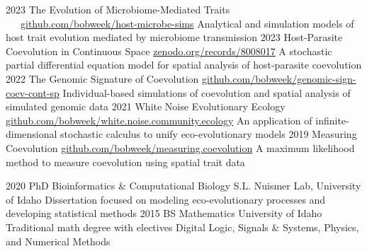 \documentclass[9pt]{developercv} %
\begin{document}
\vspace{-20 pt}
\begin{entrylist}
        \entry
		{2023}
		{The Evolution of Microbiome-Mediated Traits}
		{\ \ \ \href{https://github.com/bobweek/host-microbe-sims}{github.com/bobweek/host-microbe-sims}}
		{%
        Analytical and simulation models of host trait evolution mediated by microbiome transmission}
        \entry
		{2023}
		{Host-Parasite Coevolution in Continuous Space}
		{\href{https://zenodo.org/records/8008017}{zenodo.org/records/8008017}}
		{%
        A stochastic partial differential equation model for spatial analysis of host-parasite coevolution}
	\entry
		{2022}
		{The Genomic Signature of Coevolution}
		{\href{https://github.com/bobweek/genomic-sign-coev-cont-sp}{github.com/bobweek/genomic-sign-coev-cont-sp}}
		{%
        Individual-based simulations of coevolution and spatial analysis of simulated genomic data}
	\entry
		{2021}
		{White Noise Evolutionary Ecology}
		{\href{https://github.com/bobweek/white.noise.community.ecology}{github.com/bobweek/white.noise.community.ecology}}
		{%
        An application of infinite-dimensional stochastic calculus to unify eco-evolutionary models}
    \entry
		{2019}
		{Measuring Coevolution}
		{\href{https://github.com/bobweek/measuring.coevolution}{github.com/bobweek/measuring.coevolution}}
		{%
        A maximum likelihood method to measure coevolution using spatial trait data}
\end{entrylist}

\vspace{-10 pt}
\begin{entrylist}
    \entry
		{2020}
		{PhD Bioinformatics \& Computational Biology}
		{S.L. Nuismer Lab, University of Idaho}
		{Dissertation focused on modeling eco-evolutionary processes and developing statistical methods}
    \entry
		{2015}
		{BS Mathematics}
		{University of Idaho}
		{Traditional math degree with electives Digital Logic, Signals \& Systems, Physics, and Numerical Methods}
\end{entrylist}
\end{document}
